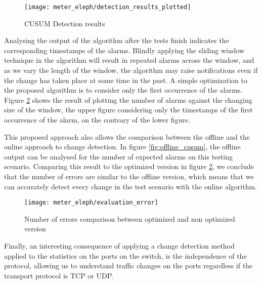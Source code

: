 \begin{figure}
    \centering
    \texttt{[image: meter\_eleph/detection\_results\_plotted]}
    \caption{CUSUM Detection results}
    \label{fig:color_plot}
\end{figure}

\par Analysing the output of the algorithm after the tests finish indicates the corresponding timestamps of the alarms. Blindly applying the sliding window technique
in the algorithm will result in repeated alarms across the window, and as we vary the length of the window, the algorithm may raise notifications even if the change
has taken place at some time in the past. A simple optimization to the proposed algorithm is to consider only the first occurrence of the alarms. Figure
\ref{fig:errors_comparaison} shows the result of plotting the number of alarms against the changing size of the window, the upper figure considering only the
timestamps of the first occurrence of the alarm, on the contrary of the lower figure.

\par This proposed approach also allows the comparison between the offline and the online approach to change detection. In figure \ref{fig:offline_cusum}, the 
offline output can be analysed for the number of expected alarms on this testing scenario. Comparing this result to the optimized version in figure 
\ref{fig:errors_comparaison}, we conclude that the number of errors are similar to the offline version, which means that we can accurately detect every change in
the test scenario with the online algorithm.

\begin{figure}
    \centering
    \texttt{[image: meter\_eleph/evaluation\_error]}
    \caption {Number of errors comparison between optimized and non optimized version}
    \label{fig:errors_comparaison}
\end{figure} 

\par Finally, an interesting consequence of applying a change detection method applied to the statistics on the ports on the switch, is the independence of the 
protocol, allowing us to understand traffic changes on the ports regardless if the transport protocol is TCP or UDP.
